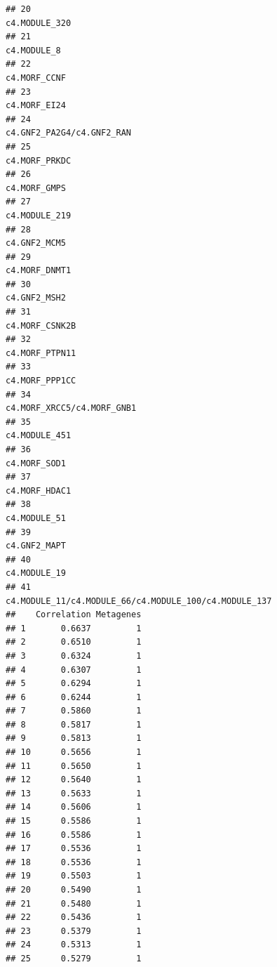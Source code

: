 \documentclass{article}\usepackage[]{graphicx}\usepackage[]{color}
\makeatletter
\newenvironment{kframe}{%
 \def\at@end@of@kframe{}%
 \ifinner\ifhmode%
  \def\at@end@of@kframe{\end{minipage}}%
  \begin{minipage}{\columnwidth}%
 \fi\fi%
 \def\FrameCommand##1{\hskip\@totalleftmargin \hskip-\fboxsep
 \colorbox{shadecolor}{##1}\hskip-\fboxsep
     \hskip-\linewidth \hskip-\@totalleftmargin \hskip\columnwidth}%
 \MakeFramed {\advance\hsize-\width
   \@totalleftmargin\z@ \linewidth\hsize
   \@setminipage}}%
 {\par\unskip\endMakeFramed%
 \at@end@of@kframe}
\newenvironment{knitrout}{}{} %
\makeatother
\begin{document}
\begin{knitrout}
\begin{kframe}
\begin{verbatim}
## 20                                                                   c4.MODULE_320
## 21                                                                     c4.MODULE_8
## 22                                                                    c4.MORF_CCNF
## 23                                                                    c4.MORF_EI24
## 24                                                       c4.GNF2_PA2G4/c4.GNF2_RAN
## 25                                                                   c4.MORF_PRKDC
## 26                                                                    c4.MORF_GMPS
## 27                                                                   c4.MODULE_219
## 28                                                                    c4.GNF2_MCM5
## 29                                                                   c4.MORF_DNMT1
## 30                                                                    c4.GNF2_MSH2
## 31                                                                  c4.MORF_CSNK2B
## 32                                                                  c4.MORF_PTPN11
## 33                                                                  c4.MORF_PPP1CC
## 34                                                      c4.MORF_XRCC5/c4.MORF_GNB1
## 35                                                                   c4.MODULE_451
## 36                                                                    c4.MORF_SOD1
## 37                                                                   c4.MORF_HDAC1
## 38                                                                    c4.MODULE_51
## 39                                                                    c4.GNF2_MAPT
## 40                                                                    c4.MODULE_19
## 41                           c4.MODULE_11/c4.MODULE_66/c4.MODULE_100/c4.MODULE_137
##    Correlation Metagenes
## 1       0.6637         1
## 2       0.6510         1
## 3       0.6324         1
## 4       0.6307         1
## 5       0.6294         1
## 6       0.6244         1
## 7       0.5860         1
## 8       0.5817         1
## 9       0.5813         1
## 10      0.5656         1
## 11      0.5650         1
## 12      0.5640         1
## 13      0.5633         1
## 14      0.5606         1
## 15      0.5586         1
## 16      0.5586         1
## 17      0.5536         1
## 18      0.5536         1
## 19      0.5503         1
## 20      0.5490         1
## 21      0.5480         1
## 22      0.5436         1
## 23      0.5379         1
## 24      0.5313         1
## 25      0.5279         1

\end{verbatim}
\end{kframe}
\end{knitrout}
\end{document}
